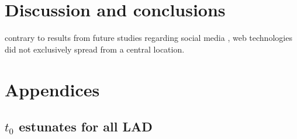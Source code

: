 \documentclass[
  authoryear,
  preprint,
  3p]{elsarticle}
\begin{document}
\section{Discussion and conclusions}\label{sec-conclusions}

contrary to results from future studies regarding social media
\citep{lengyel2020role}, web technologies did not exclusively spread
from a central location.

\setcounter{section}{0}
\renewcommand{\thesection}{\Alph{section}}

\setcounter{table}{0}
\renewcommand{\thetable}{A\arabic{table}}

\setcounter{figure}{0}
\renewcommand{\thefigure}{A\arabic{figure}}

\section{Appendices}\label{appendices}


\subsection{\texorpdfstring{\(t_0\) estunates for all
LAD}{t\_0 estunates for all LAD}}\label{t_0-estunates-for-all-lad}
\end{document}
